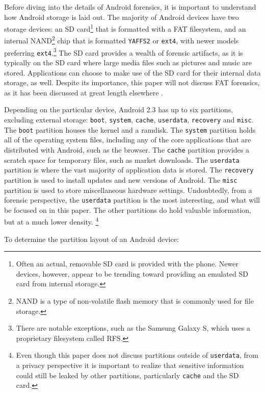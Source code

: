 Before diving into the details of Android forensics, it is important to understand how Android storage is laid out.  The majority of
Android devices have two storage devices: an SD card\footnote{Often an actual, removable SD card is provided with the phone. Newer
devices, however, appear to be trending toward providing an emulated SD card from internal storage.} that is formatted with a FAT
filesystem, and an internal NAND\footnote{NAND is a type of non-volatile flash memory that is commonly used for file storage.} chip
that is formatted \texttt{YAFFS2} or \texttt{ext4}, with newer models preferring \texttt{ext4}.\footnote{There are notable
exceptions, such as the Samsung Galaxy S, which uses a proprietary filesystem called RFS.} The SD card provides a wealth of forensic
artifacts, as it is typically on the SD card where large media files such as pictures and music are stored.  Applications can choose
to make use of the SD card for their internal data storage, as well.  Despite its importance, this paper will not discuss FAT
forensics, as it has been discussed at great length elsewhere \cite{carrier}. 

Depending on the particular device, Android 2.3 has up to six partitions, excluding external storage: \texttt{boot}, \texttt{system}, \texttt{cache}, \texttt{userdata},
\texttt{recovery} and \texttt{misc}. 
The \texttt{boot} partition houses the kernel and a ramdisk.
The \texttt{system} partition holds all of the operating system files, including any of the core applications that are distributed with Android, such as the browser. 
The \texttt{cache} partition provides a scratch space for temporary files, such as market downloads.
The \texttt{userdata} partition is where the vast majority of application data is stored.
The \texttt{recovery} partition is used to install updates and new versions of Android. 
The \texttt{misc} partition is used to store miscellaneous hardware settings.
Undoubtedly, from a forensic perspective, the \texttt{userdata} partition is the most interesting, and what will be focused on in
this paper. The other partitions do hold valuable information, but at a much lower density.
\footnote{Even though this paper does not discuss partitions outside of \texttt{userdata}, from a privacy perspective it is
important to realize that sensitive information could still be leaked by other partitions, particularly \texttt{cache} and the SD
card.}

To determine the partition layout of an Android device:

